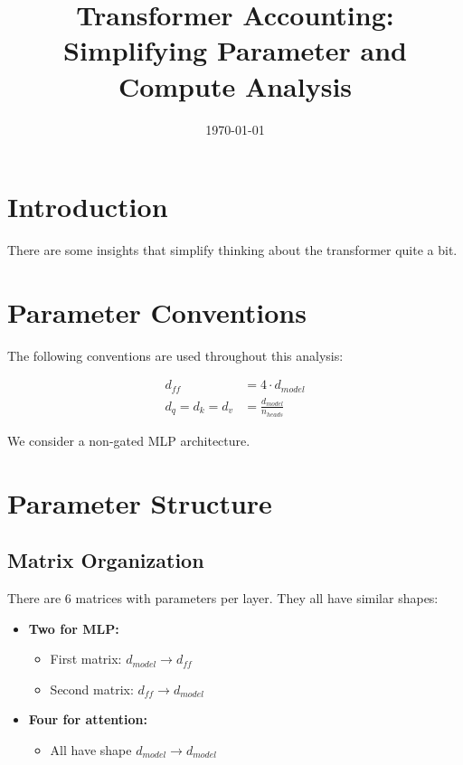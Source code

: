 \documentclass[11pt,a4paper]{article}
\begin{document}
\title{Transformer Accounting: Simplifying Parameter and Compute Analysis}
\author{}
\date{\today}
\maketitle

\section{Introduction}

There are some insights that simplify thinking about the transformer quite a bit.

\section{Parameter Conventions}

The following conventions are used throughout this analysis:

\begin{align}
d_{ff} &= 4 \cdot d_{model} \\
d_q = d_k = d_v &= \frac{d_{model}}{n_{heads}}
\end{align}

We consider a non-gated MLP architecture.

\section{Parameter Structure}

\subsection{Matrix Organization}

There are 6 matrices with parameters per layer. They all have similar shapes:

\begin{itemize}
    \item \textbf{Two for MLP:}
    \begin{itemize}
        \item First matrix: $d_{model} \rightarrow d_{ff}$
        \item Second matrix: $d_{ff} \rightarrow d_{model}$
    \end{itemize}
    
    \item \textbf{Four for attention:}
    \begin{itemize}
        \item All have shape $d_{model} \rightarrow d_{model}$
    \end{itemize}
\end{itemize}
\end{document}
